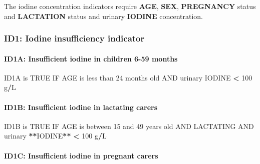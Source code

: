\documentclass[12pt,a4paper]{article}
\newenvironment{Shaded}{\begin{snugshade}}{\end{snugshade}}
\newcommand{\DecValTok}[1]{\textcolor[rgb]{0.00,0.00,0.81}{#1}}
\newcommand{\ErrorTok}[1]{\textcolor[rgb]{0.64,0.00,0.00}{\textbf{#1}}}
\newcommand{\NormalTok}[1]{#1}
\newcommand{\OperatorTok}[1]{\textcolor[rgb]{0.81,0.36,0.00}{\textbf{#1}}}
\newcommand{\OtherTok}[1]{\textcolor[rgb]{0.56,0.35,0.01}{#1}}
\newcommand{\StringTok}[1]{\textcolor[rgb]{0.31,0.60,0.02}{#1}}
\let\oldparagraph\paragraph
\renewcommand{\paragraph}[1]{\oldparagraph{#1}\mbox{}}
\begin{document}
The iodine concentration indicators require \textbf{AGE}, \textbf{SEX}, \textbf{PREGNANCY} status and \textbf{LACTATION} status and urinary \textbf{IODINE} concentration.

\newpage

\hypertarget{id1-iodine-insufficiency-indicator}{%
\subsubsection{ID1: Iodine insufficiency indicator}\label{id1-iodine-insufficiency-indicator}}

\hypertarget{id1a-insufficient-iodine-in-children-6-59-months}{%
\paragraph{ID1A: Insufficient iodine in children 6-59 months}\label{id1a-insufficient-iodine-in-children-6-59-months}}

\begin{Shaded}
\begin{Highlighting}[]
\NormalTok{ID1A is }\OtherTok{TRUE}\NormalTok{ IF AGE is less than }\DecValTok{24}\NormalTok{ months old AND urinary IODINE }\OperatorTok{<}\StringTok{ }\DecValTok{100}\NormalTok{ g}\OperatorTok{/}\NormalTok{L}
\end{Highlighting}
\end{Shaded}

\hypertarget{id1b-insufficient-iodine-in-lactating-carers}{%
\paragraph{ID1B: Insufficient iodine in lactating carers}\label{id1b-insufficient-iodine-in-lactating-carers}}

\begin{Shaded}
\begin{Highlighting}[]
\NormalTok{ID1B is }\OtherTok{TRUE}\NormalTok{ IF AGE is between }\DecValTok{15}\NormalTok{ and }\DecValTok{49}\NormalTok{ years old AND}
\NormalTok{  LACTATING AND urinary }\OperatorTok{**}\NormalTok{IODINE}\OperatorTok{**}\StringTok{ }\ErrorTok{<}\StringTok{ }\DecValTok{100}\NormalTok{ g}\OperatorTok{/}\NormalTok{L}
\end{Highlighting}
\end{Shaded}

\hypertarget{id1c-insufficient-iodine-in-pregnant-carers}{%
\paragraph{ID1C: Insufficient iodine in pregnant carers}\label{id1c-insufficient-iodine-in-pregnant-carers}}
\end{document}
